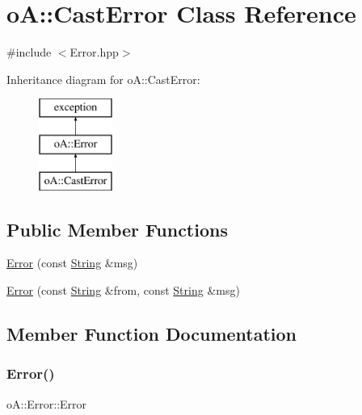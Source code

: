 \hypertarget{classo_a_1_1_cast_error}{}\section{oA\+:\+:Cast\+Error Class Reference}
\label{classo_a_1_1_cast_error}


{\ttfamily \#include $<$Error.\+hpp$>$}

Inheritance diagram for oA\+:\+:Cast\+Error\+:\begin{figure}[H]
\begin{center}
\leavevmode
\includegraphics[height=3.000000cm]{classo_a_1_1_cast_error}
\end{center}
\end{figure}
\subsection*{Public Member Functions}
\begin{DoxyCompactItemize}
\item 
\mbox{\hyperlink{classo_a_1_1_cast_error_a16d10704561d2b756722d71d8703089c}{Error}} (const \mbox{\hyperlink{classo_a_1_1_string}{String}} \&msg)
\item 
\mbox{\hyperlink{classo_a_1_1_cast_error_adf66492ca8b03fa14d09e5bba7cdacbd}{Error}} (const \mbox{\hyperlink{classo_a_1_1_string}{String}} \&from, const \mbox{\hyperlink{classo_a_1_1_string}{String}} \&msg)
\end{DoxyCompactItemize}


\subsection{Member Function Documentation}
\mbox{\label{classo_a_1_1_cast_error_a16d10704561d2b756722d71d8703089c}} 
\subsubsection{\texorpdfstring{Error()}{Error()}\hspace{0.1cm}{\footnotesize\ttfamily [1/2]}}
{\footnotesize\ttfamily o\+A\+::\+Error\+::\+Error\hspace{0.3cm}{\ttfamily [inline]}}

